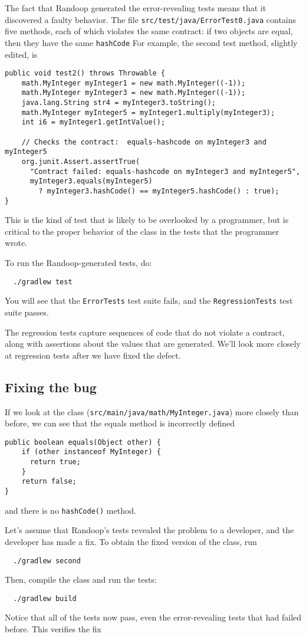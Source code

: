 \documentclass[11pt, oneside]{article} %
\newcommand{\code}[1]{{\texttt{#1}}}
\begin{document}
The fact that Randoop generated the error-revealing tests means that it
discovered a faulty behavior.
The file \texttt{src/test/java/ErrorTest0.java} contains five methods, each
of which violates the same contract:
if two objects are equal, then they have the same \code{hashCode}
For example, the second test method, slightly edited, is
\begin{verbatim}
public void test2() throws Throwable {
    math.MyInteger myInteger1 = new math.MyInteger((-1));
    math.MyInteger myInteger3 = new math.MyInteger((-1));
    java.lang.String str4 = myInteger3.toString();
    math.MyInteger myInteger5 = myInteger1.multiply(myInteger3);
    int i6 = myInteger1.getIntValue();
    
    // Checks the contract:  equals-hashcode on myInteger3 and myInteger5
    org.junit.Assert.assertTrue(
      "Contract failed: equals-hashcode on myInteger3 and myInteger5",
      myInteger3.equals(myInteger5) 
        ? myInteger3.hashCode() == myInteger5.hashCode() : true);
}
\end{verbatim}
This is the kind of test that is likely to be overlooked by a programmer, but is critical to the proper behavior of the class in the tests that the programmer wrote.

To run the Randoop-generated tests, do:
\begin{verbatim}
  ./gradlew test
\end{verbatim}
You will see that the \texttt{ErrorTests} test suite fails, and the
\texttt{RegressionTests} test suite passes.

The regression tests capture sequences of code that do not violate a contract, along with assertions about the values that are generated. 
We'll look more closely at regression tests after we have fixed the defect.

\subsection{Fixing the bug}

If we look at the class (\texttt{src/main/java/math/MyInteger.java}) more closely than before, we can see that the equals method is incorrectly defined
\begin{verbatim}
public boolean equals(Object other) {
    if (other instanceof MyInteger) {
      return true;
    }
    return false;
}
\end{verbatim}
and there is no \code{hashCode()} method.

Let's assume that Randoop's tests revealed the problem to a developer, and
the developer has made a fix.  To obtain the fixed version of the class, run
\begin{verbatim}
  ./gradlew second
\end{verbatim}
Then, compile the class and run the tests:
\begin{verbatim}
  ./gradlew build
\end{verbatim}
Notice that all of the tests now pass, even the error-revealing tests that had failed before.
This verifies the fix
\end{document}
